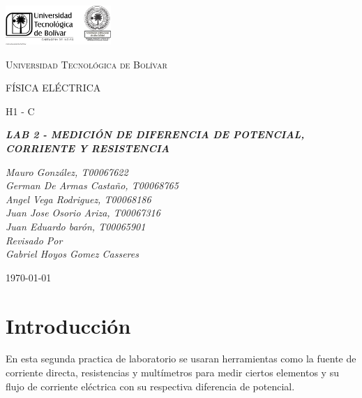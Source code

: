 \documentclass[letterpaper, 12pt]{report}
\begin{document}
\begin{titlepage}
	\centering
	\includegraphics[width=0.3\textwidth]{Images/logo_utb.png}\par\vspace{1cm}
	{\scshape\LARGE Universidad Tecnológica de Bolívar \par}
	\vspace{1cm}

	{\scshape\Large FÍSICA ELÉCTRICA \par}
	\vspace{.2cm}

	{\scshape\Large H1 - C \par}
	\vspace{1cm}
	\slshape {\Large \bfseries{} LAB 2 - MEDICIÓN DE DIFERENCIA DE POTENCIAL, CORRIENTE Y RESISTENCIA \\}
	\vspace{1cm}

	\slshape {\itshape{} Mauro González, T00067622 \\}
	\slshape {\itshape{} German De Armas Castaño, T00068765 \\}
	\slshape {\itshape{} Angel Vega Rodriguez, T00068186 \\}
	\slshape {\itshape{} Juan Jose Osorio Ariza, T00067316 \\}
	\slshape {\itshape{} Juan Eduardo barón, T00065901 \\}
	\vfill
	Revisado Por \\
	Gabriel Hoyos Gomez Casseres\\
	{\large \today\par}
\end{titlepage}

\section{Introducción}

En esta segunda practica de laboratorio se usaran herramientas como la 
fuente de corriente directa, resistencias y multímetros para medir ciertos 
elementos y su flujo de corriente eléctrica con su respectiva diferencia 
de potencial. 

\vspace{.5cm}
\end{document}
